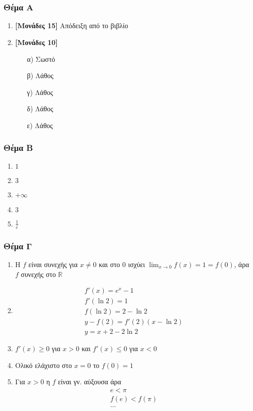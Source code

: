 \documentclass[12pt]{article}
\begin{document}
\part*{}

\section*{Θέμα Α}
  \noindent
  \begin{enumerate}
    \item \textbf{[Μονάδες 15]} Απόδειξη από το βιβλίο
    \item \textbf{[Μονάδες 10]}
    \begin{enumerate}
      \item [α)] Σωστό
      \item [β)] Λάθος
      \item [γ)] Λάθος
      \item [δ)] Λάθος
      \item [ε)] Λάθος
    \end{enumerate}
  \end{enumerate}

\section*{Θέμα Β}
  \noindent
  \begin{enumerate}
    \item $1$
    \item $3$
    \item $+\infty$
    \item $3$
    \item $\frac{1}{e}$
  \end{enumerate}

\section*{Θέμα Γ}
  \noindent
  \begin{enumerate}
    \item Η $f$ είναι συνεχής για $x\ne0$ και στο $0$ ισχύει $\lim_{x\to 0}f(x)=1=f(0)$, άρα $f$ συνεχής στο $\mathbb{R}$
    \item \begin{gather*}f'(x)=e^x-1 \\ f'(\ln2)=1 \\ f(\ln2)=2-\ln2 \\ y-f(2)=f'(2)(x-\ln2) \\ y=x+2-2\ln2 \end{gather*}
    \item $f'(x) \ge 0$ για $x>0$ και $f'(x) \le 0$ για $x<0$
    \item Ολικό ελάχιστο στο $x=0$ το $f(0)=1$
    \item Για $x>0$ η $f$ είναι γν. αύξουσα άρα \begin{gather*}e<\pi \\ f(e)<f(\pi) \\ \ldots \end{gather*}
  \end{enumerate}
\end{document}
